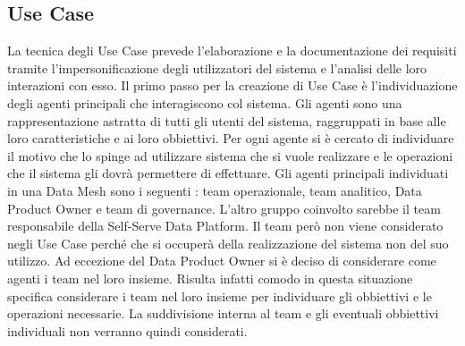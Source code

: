 \documentclass[12pt]{report}
\begin{document}
\subsection{Use Case}
La tecnica degli Use Case prevede l'elaborazione e la documentazione dei requisiti tramite l'impersonificazione degli utilizzatori del sistema e l'analisi delle loro interazioni con esso. 
Il primo passo per la creazione di Use Case è l'individuazione degli agenti principali che interagiscono col sistema.
Gli agenti sono una rappresentazione astratta di tutti gli utenti del sistema, raggruppati in base alle loro caratteristiche e ai loro obbiettivi. 
Per ogni agente si è cercato di individuare il motivo che lo spinge ad utilizzare sistema che si vuole realizzare e le operazioni che il sistema gli dovrà permettere di effettuare. 
Gli agenti principali individuati in una Data Mesh sono i seguenti : team operazionale, team analitico, Data Product Owner e team di governance.
L'altro gruppo coinvolto sarebbe il team responsabile della Self-Serve Data Platform.
Il team però non viene considerato negli Use Case perché che si occuperà della realizzazione del sistema non del suo utilizzo. 
Ad eccezione del Data Product Owner si è deciso di considerare come agenti i team nel loro insieme.
Risulta infatti comodo in questa situazione specifica considerare i team nel loro insieme per individuare gli obbiettivi e le operazioni necessarie. 
La suddivisione interna al team e gli eventuali obbiettivi individuali non verranno quindi considerati.
\end{document}
